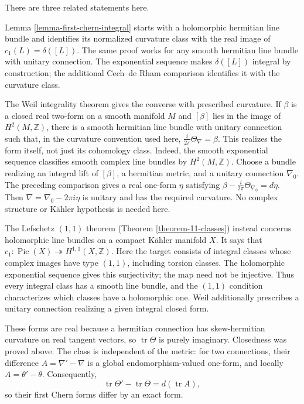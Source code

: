 \begin{remark}
\label{remark-weil-and-lefschetz}
There are three related statements here.

Lemma \ref{lemma-first-chern-integral}
starts with a holomorphic hermitian line
bundle and identifies its normalized
curvature class with the real image of
$c_1(L)=\delta([L])$.
The same proof works for any smooth
hermitian line bundle with unitary
connection. The exponential sequence
makes $\delta([L])$ integral by
construction; the additional
Cech--de Rham comparison identifies it
with the curvature class.

The Weil integrality theorem gives the
converse with prescribed curvature.
If $\beta$ is a closed real two-form
on a smooth manifold $M$ and $[\beta]$
lies in the image of $H^2(M,\mathbb{Z})$,
there is a smooth hermitian line bundle
with unitary connection such that,
in the curvature convention used here,
$
\frac{i}{2\pi}\Theta_\nabla=\beta.
$
This realizes the form itself, not just
its cohomology class.
Indeed, the smooth exponential sequence
classifies smooth complex line bundles
by $H^2(M,\mathbb{Z})$.
Choose a bundle realizing an integral
lift of $[\beta]$, a hermitian metric,
and a unitary connection $\nabla_0$.
The preceding comparison gives a real
one-form $\eta$ satisfying
$
\beta-\frac{i}{2\pi}\Theta_{\nabla_0}
=d\eta.
$
Then
$
\nabla=\nabla_0-2\pi i\eta
$
is unitary and has the required
curvature. No complex structure or
Kähler hypothesis is needed here.

The Lefschetz $(1,1)$ theorem
(Theorem \ref{theorem-11-classes})
instead concerns holomorphic line
bundles on a compact Kähler manifold
$X$. It says that
$
c_1:\operatorname{Pic}(X)
\twoheadrightarrow H^{1,1}(X,\mathbb{Z}).
$
Here the target consists of integral
classes whose complex images have
type $(1,1)$, including torsion classes.
The holomorphic exponential sequence
gives this surjectivity; the map need
not be injective. Thus every integral
class has a smooth line bundle, and
the $(1,1)$ condition characterizes
which classes have a holomorphic one.
Weil additionally prescribes a unitary
connection realizing a given integral
closed form.
\end{remark}

\noindent
These forms are real because a hermitian
connection has skew-hermitian curvature
on real tangent vectors, so
$\operatorname{tr}\Theta$ is purely
imaginary. Closedness was proved above.
The class is independent of the metric:
for two connections, their difference
$A=\nabla'-\nabla$ is a global
endomorphism-valued one-form, and locally
$A=\theta'-\theta$. Consequently,
$$
\operatorname{tr}\Theta'
-\operatorname{tr}\Theta
=d(\operatorname{tr}A),
$$
so their first Chern forms differ by
an exact form.

